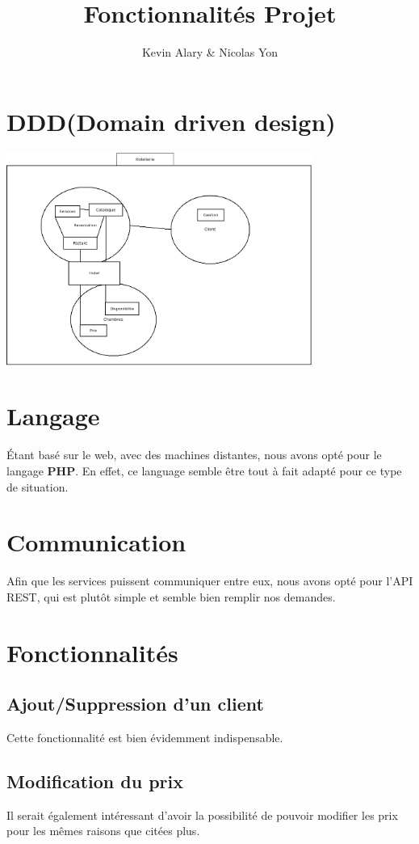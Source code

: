 \documentclass{article}
\title{Fonctionnalit\'es Projet}
\author{Kevin Alary \& Nicolas Yon}
\date{}
\begin{document}
\maketitle

\section{DDD(Domain driven design)}
\includegraphics[width=10cm]{ddd.png} \\


\section{Langage}
\'Etant bas\'e sur le web, avec des machines distantes, nous avons opt\'e pour le langage \textbf{PHP}. En effet, ce language semble \^{e}tre tout \`a fait adapt\'e pour ce type de situation.


\section{Communication}
Afin que les services puissent communiquer entre eux, nous avons opt\'e pour l'API REST, qui est plut\^{o}t simple et semble bien remplir nos demandes.


\section{Fonctionnalit\'es}


\subsection{Ajout/Suppression d'un client}
Cette fonctionnalit\'e est bien \'evidemment indispensable.


\subsection{Modification du prix}
Il serait \'egalement int\'eressant d'avoir la possibilit\'e de pouvoir modifier les prix pour les m\^{e}mes raisons que cit\'ees plus.
\end{document}
